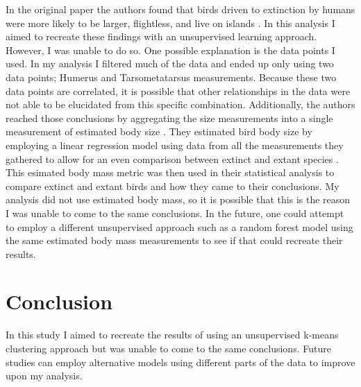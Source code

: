 \documentclass{bioinfo}
\begin{document}
In the original paper the authors found that birds driven to extinction
by humans were more likely to be larger, flightless, and live on islands
\citep{fromm_big_2021}. In this analysis I aimed to recreate these
findings with an unsupervised learning approach. However, I was unable
to do so. One possible explanation is the data points I used. In my
analysis I filtered much of the data and ended up only using two data
points; Humerus and Tarsometatarsus measurements. Because these two data
points are correlated, it is possible that other relationships in the
data were not able to be elucidated from this specific combination.
Additionally, the authors reached those conclusions by aggregating the
size measurements into a single measurement of estimated body size
\citep{fromm_big_2021}. They estimated bird body size by employing a
linear regression model using data from all the measurements they
gathered to allow for an even comparison between extinct and extant
species \citep{fromm_big_2021}. This esimated body mass metric was then
used in their statistical analysis to compare extinct and extant birds
and how they came to their conclusions. My analysis did not use
estimated body mass, so it is possible that this is the reason I was
unable to come to the same conclusions. In the future, one could attempt
to employ a different unsupervised approach such as a random forest
model using the same estimated body mass measurements to see if that
could recreate their results.

\section{Conclusion}

In this study I aimed to recreate the results of \citet{fromm_big_2021}
using an unsupervised k-means clustering approach but was unable to come
to the same conclusions. Future studies can employ alternative models
using different parts of the data to improve upon my analysis.




\end{document}
